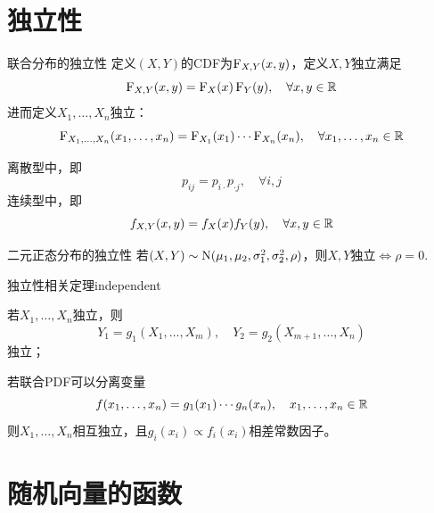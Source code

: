 \section{独立性}

\begin{definition}{联合分布的独立性}{}
	定义$(X,Y)$的CDF为$\operatorname{F}_{X,Y}(x,y)$，定义$X,Y$独立满足
	\begin{equation}
		\operatorname{F}_{X,Y}(x,y) = \operatorname{F}_X(x)\operatorname{F}_Y(y),\quad\forall x,y \in \mathbb{R}
	\end{equation}
	进而定义$X_1,\ldots,X_n$独立： 
	\begin{equation}\label{eq:ps-independent-cdf}
		\operatorname{F}_{X_1,\ldots,X_n}(x_1,\ldots,x_n) = \operatorname{F}_{X_1}(x_1)\cdots\operatorname{F}_{X_n}(x_n),\quad\forall x_1,\ldots,x_n \in \mathbb{R}
	\end{equation}
\end{definition}
\begin{corollary}
	离散型中，即
	\begin{equation}\label{eq:ps-independent-mass}
		p_{ij} = p_{i\cdot}p_{\cdot j},\quad \forall i,j
	\end{equation}
	连续型中，即
	\begin{equation}\label{eq:ps-independent-density}
		f_{X,Y}(x,y) = f_X(x)f_Y(y),\quad \forall x,y \in \mathbb{R}
	\end{equation}
\end{corollary}
\begin{example}{二元正态分布的独立性}{}
	若$(X,Y) \sim \operatorname{N}(\mu_1,\mu_2,\sigma_1^2,\sigma_2^2,\rho)$，则$X,Y$独立$\iff \rho = 0.$
\end{example}


\begin{theorem}{独立性相关定理}{independent}
	\begin{compactenum}
		\item 若$X_1,\ldots,X_n$独立，则
		\[
			Y_1 = g_1(X_1,\ldots,X_m),\quad Y_2 = g_2(X_{m+1},\ldots,X_n)
		\]
		独立；
		\item 若联合PDF可以分离变量
		\[
			f(x_1,\ldots,x_n) = g_1(x_1)\cdots g_n(x_n),\quad x_1,\ldots,x_n \in \mathbb{R}
		\]
		则$X_1,\ldots,X_n$相互独立，且$g_i(x_i) \propto f_i(x_i)$相差常数因子。
	\end{compactenum}
\end{theorem}

\section{随机向量的函数}

